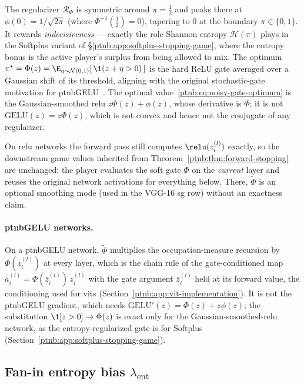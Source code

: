 The regularizer $\mathcal{R}_\Phi$ is symmetric around $\pi = \tfrac12$ and peaks there at $\phi(0)
    = 1/\sqrt{2\pi}$ (where $\Phi^{-1}(\tfrac12) = 0$), tapering to $0$ at the boundary
$\pi\in\{0,1\}$. It rewards \emph{indecisiveness} --- exactly the role Shannon entropy
$\mathcal{H}(\pi)$ plays in the Softplus variant of \S\ref{ptnb:app:softplus-stopping-game}, where the
entropy bonus is the active player's surplus from being allowed to mix. The optimum $\pi^\star =
    \Phi(z) = \E_{\eta\sim\mathcal{N}(0,1)}[\,\1(z+\eta > 0)\,]$ is the hard ReLU gate averaged over a
Gaussian shift of its threshold, aligning with the original stochastic-gate motivation for
\acs{ptnbGELU}~\parencite{Hendrycks2016}. The optimal value~\eqref{ptnb:eq:noisy-gate-optimum} is the
Gaussian-smoothed \acs{relu} $z\Phi(z) + \phi(z)$, whose derivative is $\Phi$; it is not
$\mathrm{GELU}(z) = z\Phi(z)$, which is not convex and hence not the conjugate of any regularizer.

On \ac{relu} networks the forward pass still computes $\relu(z_i^{(l)})$ exactly, so the downstream
game values inherited from Theorem~\ref{ptnb:thm:forward-stopping} are unchanged: the player evaluates
the soft gate $\tilde\Phi$ on the \emph{current} layer and reuses the original network activations
for everything below. There, $\tilde\Phi$ is an optional smoothing mode (used in the VGG-16 \ac{sg}
row) without an exactness claim.

\paragraph{\acs{ptnbGELU} networks.}\label{ptnb:app:gelu-noisy-gate}
On a \acs{ptnbGELU} network, $\tilde\Phi$ multiplies the occupation-measure recursion by
$\Phi(z_i^{(l)})$ at every layer, which is the chain rule of the gate-conditioned map $a_i^{(l)} =
    \Phi(\bar z_i^{(l)})\, z_i^{(l)}$ with the gate argument $\bar z_i^{(l)}$ held at its forward
value, the conditioning used for \acs{vit}s (Section~\ref{ptnb:app:vit-implementation}). It is not the
\acs{ptnbGELU} gradient, which needs $\mathrm{GELU}'(z) = \Phi(z) + z\phi(z)$; the substitution
$\1[z>0] \to \Phi(z)$ is exact only for the Gaussian-smoothed-\acs{relu} network, as the
entropy-regularized gate is for Softplus (Section~\ref{ptnb:app:softplus-stopping-game}).

\subsection{\texorpdfstring{Fan-in entropy bias $\lambda_{\mathrm{ent}}$}{Fan-in entropy bias lambda\_ent}}\label{ptnb:app:entropy-mode}

